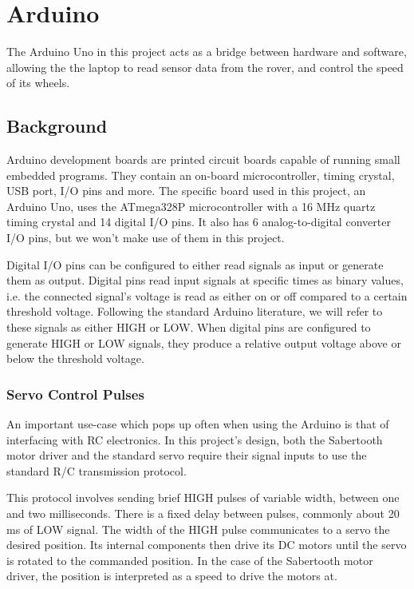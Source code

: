 \chapter{Arduino}

The Arduino Uno in this project acts as a bridge between hardware and software, allowing the the laptop to read sensor data from the rover, and control the speed of its wheels.

\section{Background}
Arduino development boards are printed circuit boards capable of running small embedded programs. They contain an on-board microcontroller, timing crystal, USB port, I/O pins and more. The specific board used in this project, an Arduino Uno, uses the ATmega328P microcontroller with a 16 MHz quartz timing crystal and 14 digital I/O pins. It also has 6 analog-to-digital converter I/O pins, but we won't make use of them in this project. 

Digital I/O pins can be configured to either read signals as input or generate them as output. Digital pins read input signals at specific times as binary values, i.e. the connected signal's voltage is read as either on or off compared to a certain threshold voltage. Following the standard Arduino literature, we will refer to these signals as either HIGH or LOW. When digital pins are configured to generate HIGH or LOW signals, they produce a relative output voltage above or below the threshold voltage.

\subsection{Servo Control Pulses} \label{sectionRCPulses}
An important use-case which pops up often when using the Arduino is that of interfacing with RC electronics. In this project's design, both the Sabertooth motor driver and the standard servo require their signal inputs to use the standard R/C transmission protocol.

This protocol involves sending brief HIGH pulses of variable width, between one and two milliseconds. There is a fixed delay between pulses, commonly about 20 ms of LOW signal. The width of the HIGH pulse communicates to a servo the desired position. Its internal components then drive its DC motors until the servo is rotated to the commanded position. In the case of the Sabertooth motor driver, the position is interpreted as a speed to drive the motors at.

